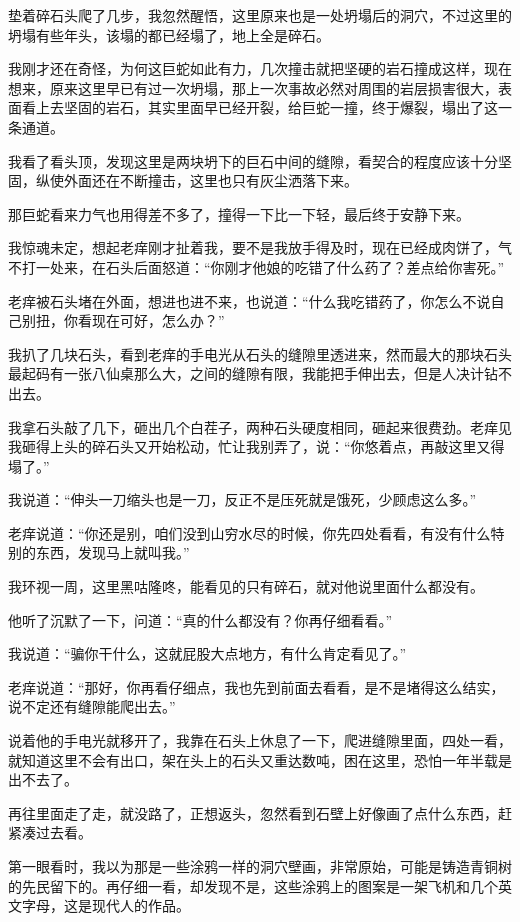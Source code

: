 垫着碎石头爬了几步，我忽然醒悟，这里原来也是一处坍塌后的洞穴，不过这里的坍塌有些年头，该塌的都已经塌了，地上全是碎石。

我刚才还在奇怪，为何这巨蛇如此有力，几次撞击就把坚硬的岩石撞成这样，现在想来，原来这里早已有过一次坍塌，那上一次事故必然对周围的岩层损害很大，表面看上去坚固的岩石，其实里面早已经开裂，给巨蛇一撞，终于爆裂，塌出了这一条通道。

我看了看头顶，发现这里是两块坍下的巨石中间的缝隙，看契合的程度应该十分坚固，纵使外面还在不断撞击，这里也只有灰尘洒落下来。

那巨蛇看来力气也用得差不多了，撞得一下比一下轻，最后终于安静下来。

我惊魂未定，想起老痒刚才扯着我，要不是我放手得及时，现在已经成肉饼了，气不打一处来，在石头后面怒道：“你刚才他娘的吃错了什么药了？差点给你害死。”

老痒被石头堵在外面，想进也进不来，也说道：“什么我吃错药了，你怎么不说自己别扭，你看现在可好，怎么办？”

我扒了几块石头，看到老痒的手电光从石头的缝隙里透进来，然而最大的那块石头最起码有一张八仙桌那么大，之间的缝隙有限，我能把手伸出去，但是人决计钻不出去。

我拿石头敲了几下，砸出几个白茬子，两种石头硬度相同，砸起来很费劲。老痒见我砸得上头的碎石头又开始松动，忙让我别弄了，说：“你悠着点，再敲这里又得塌了。”

我说道：“伸头一刀缩头也是一刀，反正不是压死就是饿死，少顾虑这么多。”

老痒说道：“你还是别，咱们没到山穷水尽的时候，你先四处看看，有没有什么特别的东西，发现马上就叫我。”

我环视一周，这里黑咕隆咚，能看见的只有碎石，就对他说里面什么都没有。

他听了沉默了一下，问道：“真的什么都没有？你再仔细看看。”

我说道：“骗你干什么，这就屁股大点地方，有什么肯定看见了。”

老痒说道：“那好，你再看仔细点，我也先到前面去看看，是不是堵得这么结实，说不定还有缝隙能爬出去。”

说着他的手电光就移开了，我靠在石头上休息了一下，爬进缝隙里面，四处一看，就知道这里不会有出口，架在头上的石头又重达数吨，困在这里，恐怕一年半载是出不去了。

再往里面走了走，就没路了，正想返头，忽然看到石壁上好像画了点什么东西，赶紧凑过去看。

第一眼看时，我以为那是一些涂鸦一样的洞穴壁画，非常原始，可能是铸造青铜树的先民留下的。再仔细一看，却发现不是，这些涂鸦上的图案是一架飞机和几个英文字母，这是现代人的作品。

